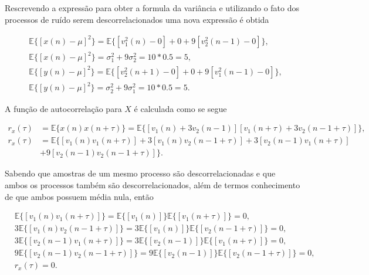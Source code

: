         Rescrevendo a expressão para obter a formula da variância e utilizando o fato dos processos de ruído serem descorrelacionados uma nova expressão é obtida
        
        \begin{align}
            &\mathbb{E}\{[x(n) - \mu]^{2}\} = \mathbb{E}\{ [v^{2}_{1}(n) - 0] + 0 + 9[v^{2}_{2}(n-1) - 0]\}, \\
            &\mathbb{E}\{[x(n) - \mu]^{2}\} = \sigma^{2}_{1} + 9\sigma^{2}_{2} = 10*0.5 = 5, \\
            &\mathbb{E}\{[y(n) - \mu]^{2}\} = \mathbb{E}\{ [v^{2}_{2}(n+1) - 0] + 0 + 9[v^{2}_{1}(n-1) - 0]\}, \\
            &\mathbb{E}\{[y(n) - \mu]^{2}\} = \sigma^{2}_{2} + 9\sigma^{2}_{1} = 10*0.5 = 5.
        \end{align}
        
        A função de autocorrelação para $X$ é calculada como se segue 
        
        \begin{align}
            r_{x}(\tau) &= \mathbb{E}\{x(n)x(n + \tau)\} = \mathbb{E}\{[v_{1}(n) + 3v_{2}(n-1)][v_{1}(n + \tau) + 3v_{2}(n-1 + \tau)]\}, \\
            r_{x}(\tau) &= \mathbb{E}\{[v_{1}(n)v_{1}(n + \tau)] + 3[v_{1}(n)v_{2}(n-1 + \tau)] + 3[v_{2}(n-1)v_{1}(n + \tau)] \\ 
            &+ 9[v_{2}(n-1)v_{2}(n-1 + \tau)] \}.    
        \end{align}
        
        Sabendo que amostras de um mesmo processo são descorrelacionadas e que ambos os processos também são descorrelacionados, além de termos conhecimento 
        de que ambos possuem média nula, então 
        
        \begin{align}
            &\mathbb{E}\{[v_{1}(n)v_{1}(n + \tau)]\} = \mathbb{E}\{[v_{1}(n)]\} \mathbb{E}\{[v_{1}(n + \tau)]\} = 0, \\ 
            &3\mathbb{E}\{[v_{1}(n)v_{2}(n-1 + \tau)]\} = 3\mathbb{E}\{[v_{1}(n)]\} \mathbb{E}\{[v_{2}(n-1 + \tau)]\} = 0, \\
            &3\mathbb{E}\{[v_{2}(n-1)v_{1}(n + \tau)]\} = 3\mathbb{E}\{[v_{2}(n-1)]\} \mathbb{E}\{[v_{1}(n + \tau)]\} = 0, \\
            &9\mathbb{E}\{[v_{2}(n-1)v_{2}(n-1 + \tau)]\} = 9\mathbb{E}\{[v_{2}(n-1)]\} \mathbb{E}\{[v_{2}(n-1 + \tau)]\} = 0, \\ 
            &r_{x}(\tau) = 0.
        \end{align}
        
